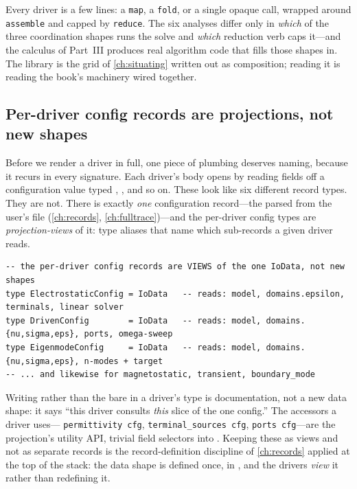 \begin{keyidea}
Every driver is a few lines: a \texttt{map}, a \texttt{fold}, or a single opaque
call, wrapped around \texttt{assemble} and capped by \texttt{reduce}. The six
analyses differ only in \emph{which} of the three coordination shapes runs the solve
and \emph{which} reduction verb caps it---and the calculus of Part~III produces real
algorithm code that fills those shapes in. The  library is the grid of
\cref{ch:situating} written out as composition; reading it is reading the book's
machinery wired together.
\end{keyidea}

\subsection{Per-driver config records are projections, not new shapes}
\label{sec:config-projections}

Before we render a driver in full, one piece of plumbing deserves naming, because it
recurs in every signature. Each driver's body opens by reading fields off a
configuration value typed , , and so on.
These look like six different record types. They are not. There is exactly
\emph{one} configuration record---the  parsed from the user's file
(\cref{ch:records}, \cref{ch:fulltrace})---and the per-driver config types are
\emph{projection-views} of it: type aliases that name which sub-records a given
driver reads.

\begin{lstlisting}[style=l4style]
-- the per-driver config records are VIEWS of the one IoData, not new shapes
type ElectrostaticConfig = IoData   -- reads: model, domains.epsilon, terminals, linear solver
type DrivenConfig        = IoData   -- reads: model, domains.{nu,sigma,eps}, ports, omega-sweep
type EigenmodeConfig     = IoData   -- reads: model, domains.{nu,sigma,eps}, n-modes + target
-- ... and likewise for magnetostatic, transient, boundary_mode
\end{lstlisting}

\noindent Writing  rather than the bare  in a
driver's type is documentation, not a new data shape: it says ``this driver consults
\emph{this} slice of the one config.'' The accessors a driver uses---%
\lstinline[style=l4style]|permittivity cfg|, \lstinline[style=l4style]|terminal_sources cfg|,
\lstinline[style=l4style]|ports cfg|---are the projection's utility API, trivial
field selectors into . Keeping these as views and not as separate
records is the record-definition discipline of \cref{ch:records} applied at the top
of the stack: the data shape is defined once, in , and the drivers
\emph{view} it rather than redefining it.

